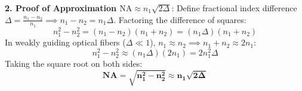 \begin{theorysol}
\textbf{2. Proof of Approximation $\text{NA} \approx n_1\sqrt{2\Delta}$}:
Define fractional index difference $\Delta = \frac{n_1 - n_2}{n_1} \implies n_1 - n_2 = n_1 \Delta$.
Factoring the difference of squares:
\begin{equation}
n_1^2 - n_2^2 = (n_1 - n_2)(n_1 + n_2) = (n_1 \Delta)(n_1 + n_2)
\end{equation}
In weakly guiding optical fibers ($\Delta \ll 1$), $n_1 \approx n_2 \implies n_1 + n_2 \approx 2 n_1$:
\begin{equation}
n_1^2 - n_2^2 \approx (n_1 \Delta)(2 n_1) = 2 n_1^2 \Delta
\end{equation}
Taking the square root on both sides:
\begin{equation}
\mathbf{\text{NA} = \sqrt{n_1^2 - n_2^2} \approx n_1 \sqrt{2\Delta}}
\end{equation}
\end{theorysol}
\vspace{4mm}

